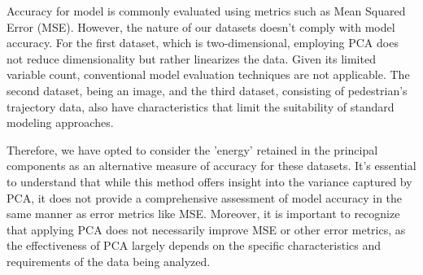 Accuracy for model is commonly evaluated using metrics such as Mean Squared Error (MSE). However, the nature of our datasets doesn't comply with model accuracy. For the first dataset, which is two-dimensional, employing PCA does not reduce dimensionality but rather linearizes the data. Given its limited variable count, conventional model evaluation techniques are not applicable. The second dataset, being an image, and the third dataset, consisting of pedestrian's trajectory data, also have characteristics that limit the suitability of standard modeling approaches. 

Therefore, we have opted to consider the 'energy' retained in the principal components as an alternative measure of accuracy for these datasets. It's essential to understand that while this method offers insight into the variance captured by PCA, it does not provide a comprehensive assessment of model accuracy in the same manner as error metrics like MSE. Moreover, it is important to recognize that applying PCA does not necessarily improve MSE or other error metrics, as the effectiveness of PCA largely depends on the specific characteristics and requirements of the data being analyzed.



